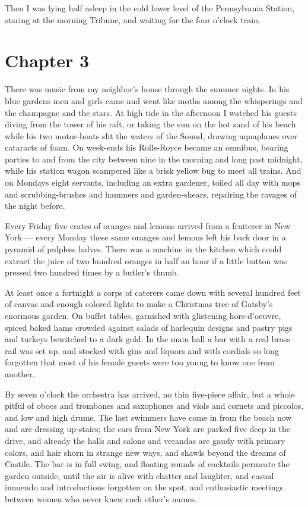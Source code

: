\documentclass{znotebook}
\begin{document}
Then I was lying half asleep in the cold lower level of the Pennsylvania Station, staring at the morning Tribune, and waiting for the four o’clock train.

\chapter{Chapter 3}

There was music from my neighbor’s house through the summer nights. In his blue gardens men and girls came and went like moths among the whisperings and the champagne and the stars. At high tide in the afternoon I watched his guests diving from the tower of his raft, or taking the sun on the hot sand of his beach while his two motor-boats slit the waters of the Sound, drawing aquaplanes over cataracts of foam. On week-ends his Rolls-Royce became an omnibus, bearing parties to and from the city between nine in the morning and long past midnight, while his station wagon scampered like a brisk yellow bug to meet all trains. And on Mondays eight servants, including an extra gardener, toiled all day with mops and scrubbing-brushes and hammers and garden-shears, repairing the ravages of the night before.

Every Friday five crates of oranges and lemons arrived from a fruiterer in New York — every Monday these same oranges and lemons left his back door in a pyramid of pulpless halves. There was a machine in the kitchen which could extract the juice of two hundred oranges in half an hour if a little button was pressed two hundred times by a butler’s thumb.

At least once a fortnight a corps of caterers came down with several hundred feet of canvas and enough colored lights to make a Christmas tree of Gatsby’s enormous garden. On buffet tables, garnished with glistening hors-d’oeuvre, spiced baked hams crowded against salads of harlequin designs and pastry pigs and turkeys bewitched to a dark gold. In the main hall a bar with a real brass rail was set up, and stocked with gins and liquors and with cordials so long forgotten that most of his female guests were too young to know one from another.

By seven o’clock the orchestra has arrived, no thin five-piece affair, but a whole pitful of oboes and trombones and saxophones and viols and cornets and piccolos, and low and high drums. The last swimmers have come in from the beach now and are dressing up-stairs; the cars from New York are parked five deep in the drive, and already the halls and salons and verandas are gaudy with primary colors, and hair shorn in strange new ways, and shawls beyond the dreams of Castile. The bar is in full swing, and floating rounds of cocktails permeate the garden outside, until the air is alive with chatter and laughter, and casual innuendo and introductions forgotten on the spot, and enthusiastic meetings between women who never knew each other’s names.
\end{document}
